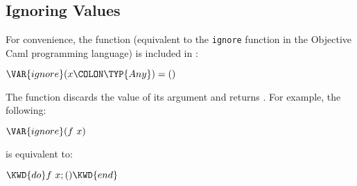 %
%
%
%

\subsection{Ignoring Values}

For convenience, the function  (equivalent to the
\texttt{ignore} function in the Objective Caml programming language) is
included in \library:
\begin{Fortress}
\(\VAR{ignore}(x\COLON \TYP{Any}) = ()\)
\end{Fortress}
The function discards the value of its argument and
returns \EXP{()}.  For example, the following:
\begin{Fortress}
\(\VAR{ignore}(f\ x)\)
\end{Fortress}
is equivalent to:
\begin{Fortress}
\(\KWD{do} f\ x; () \KWD{end}\)
\end{Fortress}
